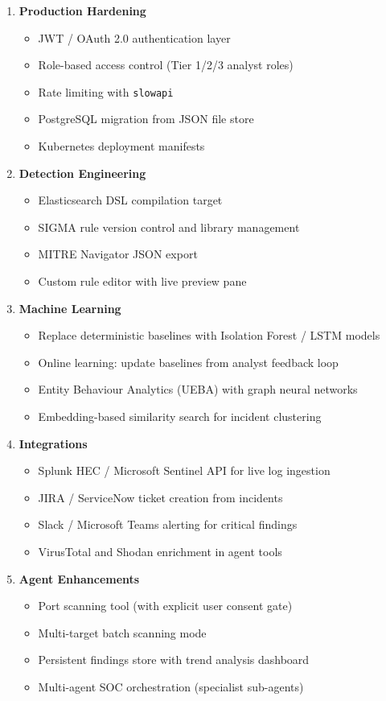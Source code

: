 \documentclass[12pt,a4paper]{article}
\begin{document}
\begin{enumerate}
  \item \textbf{Production Hardening}
  \begin{itemize}[noitemsep]
    \item JWT / OAuth 2.0 authentication layer
    \item Role-based access control (Tier 1/2/3 analyst roles)
    \item Rate limiting with \texttt{slowapi}
    \item PostgreSQL migration from JSON file store
    \item Kubernetes deployment manifests
  \end{itemize}

  \item \textbf{Detection Engineering}
  \begin{itemize}[noitemsep]
    \item Elasticsearch DSL compilation target
    \item SIGMA rule version control and library management
    \item MITRE Navigator JSON export
    \item Custom rule editor with live preview pane
  \end{itemize}

  \item \textbf{Machine Learning}
  \begin{itemize}[noitemsep]
    \item Replace deterministic baselines with Isolation Forest / LSTM models
    \item Online learning: update baselines from analyst feedback loop
    \item Entity Behaviour Analytics (UEBA) with graph neural networks
    \item Embedding-based similarity search for incident clustering
  \end{itemize}

  \item \textbf{Integrations}
  \begin{itemize}[noitemsep]
    \item Splunk HEC / Microsoft Sentinel API for live log ingestion
    \item JIRA / ServiceNow ticket creation from incidents
    \item Slack / Microsoft Teams alerting for critical findings
    \item VirusTotal and Shodan enrichment in agent tools
  \end{itemize}

  \item \textbf{Agent Enhancements}
  \begin{itemize}[noitemsep]
    \item Port scanning tool (with explicit user consent gate)
    \item Multi-target batch scanning mode
    \item Persistent findings store with trend analysis dashboard
    \item Multi-agent SOC orchestration (specialist sub-agents)
  \end{itemize}
\end{enumerate}
\end{document}

